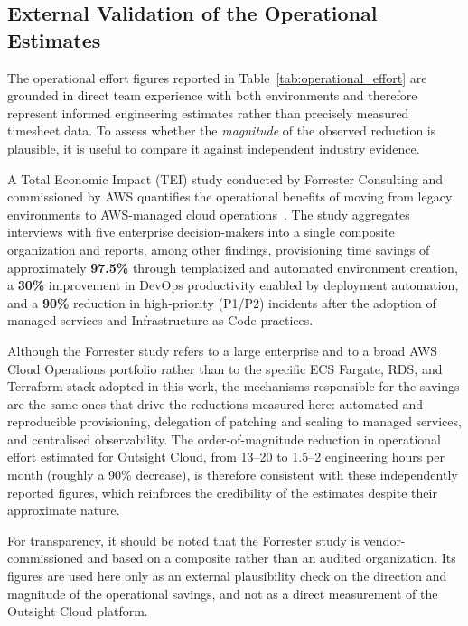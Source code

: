 \subsection{External Validation of the Operational Estimates}
\label{sec:operational-external-validation}

The operational effort figures reported in Table~\ref{tab:operational_effort}
are grounded in direct team experience with both environments and therefore
represent informed engineering estimates rather than precisely measured
timesheet data. To assess whether the \emph{magnitude} of the observed
reduction is plausible, it is useful to compare it against independent
industry evidence.

A Total Economic Impact (TEI) study conducted by Forrester Consulting and
commissioned by AWS quantifies the operational benefits of moving from
legacy environments to AWS-managed cloud operations~\cite{forresterTeiCloudOps}.
The study aggregates interviews with five enterprise decision-makers into a
single composite organization and reports, among other findings,
provisioning time savings of approximately \textbf{97.5\%} through
templatized and automated environment creation, a \textbf{30\%} improvement
in DevOps productivity enabled by deployment automation, and a
\textbf{90\%} reduction in high-priority (P1/P2) incidents after the
adoption of managed services and Infrastructure-as-Code practices.

Although the Forrester study refers to a large enterprise and to a broad
AWS Cloud Operations portfolio rather than to the specific ECS Fargate,
RDS, and Terraform stack adopted in this work, the mechanisms responsible
for the savings are the same ones that drive the reductions measured here:
automated and reproducible provisioning, delegation of patching and scaling
to managed services, and centralised observability. The order-of-magnitude
reduction in operational effort estimated for Outsight Cloud, from 13--20 to
1.5--2 engineering hours per month (roughly a 90\% decrease), is therefore
consistent with these independently reported figures, which reinforces the
credibility of the estimates despite their approximate nature.

For transparency, it should be noted that the Forrester study is
vendor-commissioned and based on a composite rather than an audited
organization. Its figures are used here only as an external plausibility
check on the direction and magnitude of the operational savings, and not as
a direct measurement of the Outsight Cloud platform.
